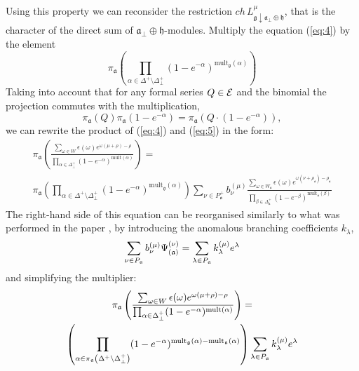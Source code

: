 \documentclass[a4paper,12pt]{article}
\theoremstyle{definition} \newtheorem{Def}{Definition}
\begin{document}
Using this property we can reconsider the restriction $ch\, L^{\mu}_{\mathfrak{g}\downarrow \mathfrak{a}_{\bot}\oplus \mathfrak{h}}$, that is the character of the direct sum of $\mathfrak{a}_{\bot}\oplus\mathfrak{h}$-modules.
Multiply the equation (\ref{eq:4}) by the element
\begin{equation}
  \label{eq:5}
  \pi_{\mathfrak{a}}\left(\prod_{\alpha\in \Delta^{+}\setminus \Delta^{+}_{\bot}}(1-e^{-\alpha})^{\mathrm{mult}_{\mathfrak{g}}(\alpha)} \right)
\end{equation}
Taking into account that for any formal series $Q \in {\cal E}$ and the binomial the projection commutes with the multiplication,
\begin{equation}
  \label{eq:6}
  \pi_{\mathfrak{a}} (Q) \pi_{\mathfrak{a}}(1-e^{-\alpha})=\pi_{\mathfrak{a}}\left(Q\cdot (1-e^{-\alpha})\right),
\end{equation}
we can rewrite the 
product of (\ref{eq:4}) and (\ref{eq:5}) in the form:
\begin{multline}
  \label{eq:7}
  \pi_{\mathfrak{a}}\left(\frac{\sum_{\omega\in W} \epsilon(\omega) e^{\omega(\mu+\rho)-\rho}}{\prod_{\alpha\in\Delta^{+}_{\bot}}(1-e^{-\alpha})^{\mathrm{mult}(\alpha)}}\right) = \\
  \pi_{\mathfrak{a}}\left(\prod_{\alpha\in \Delta^{+}\setminus \Delta^{+}_{\bot}}(1-e^{-\alpha})^{\mathrm{mult}_{\mathfrak{g}}(\alpha)} \right)\sum_{\nu\in P^{+}_{\mathfrak{a}}}b^{(\mu)}_{\nu}
  \frac{\sum_{\omega\in W_{\mathfrak{a}}}\epsilon(\omega)e^{\omega(\nu+\rho_{\mathfrak{a}})-\rho_{\mathfrak{a}}}}{\prod_{\beta\in \Delta_{\mathfrak{a}}^{+}}(1-e^{-\beta})^{\mathrm{mult}_{\mathfrak{a}}(\beta)}}
\end{multline}
The right-hand side of this equation can be reorganised similarly to what was performed in the paper \cite{ilyin812pbc}, by introducing the anomalous branching coefficients $k_{\lambda}$,
\begin{equation}
  \label{eq:10}
  \sum_{\nu \in P_{\frak{a}}}b_{\nu }^{\left( \mu \right) }\Psi _{\left( \frak{%
        a}\right) }^{\left( \nu \right) }=\sum_{\lambda \in P_{\frak{a}}}k_{\lambda
  }^{\left( \mu \right) }e^{\lambda }
\end{equation}
and simplifying the multiplier:
\begin{multline}
  \label{eq:12}
  \pi_{\mathfrak{a}}\left(\frac{\sum_{\omega\in W} \epsilon(\omega) e^{\omega(\mu+\rho)-\rho}}{\prod_{\alpha\in\Delta^{+}_{\bot}}(1-e^{-\alpha})^{\mathrm{mult}(\alpha)}}\right) = \\
  \left(\prod_{\alpha\in \pi_{\mathfrak{a}}\left(\Delta^{+}\setminus \Delta^{+}_{\bot}\right)}(1-e^{-\alpha})^{{\rm mult}_{\mathfrak{g}}(\alpha)-{\rm mult}_{\mathfrak{a}}(\alpha)} \right)
    \sum_{\lambda \in P_{\frak{a}}}k_{\lambda}^{\left( \mu \right) }e^{\lambda }
\end{multline}
\end{document}
